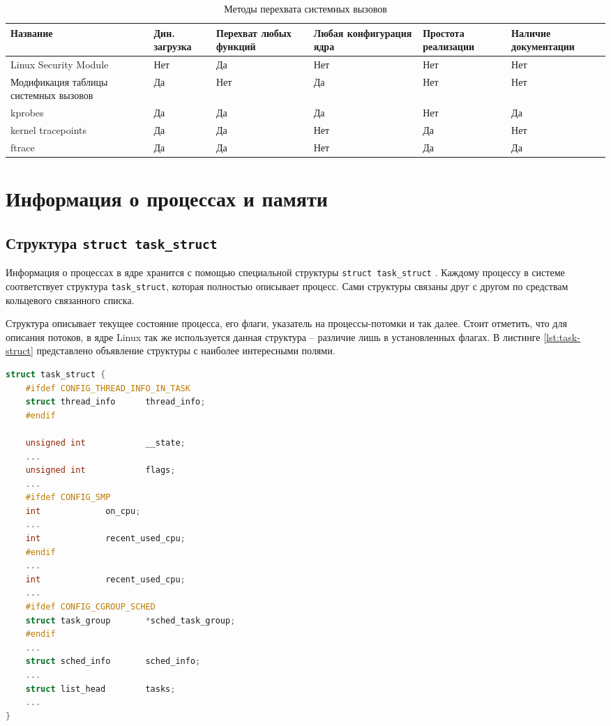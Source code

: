 \begin{table}[h]
	\centering
	\begin{tabular}{ | p{3cm} | p{2cm} | p{2cm} | p{2cm} | p{2cm} | p{2cm} | }
		\hline
		Название & Дин. загрузка & Перехват любых функций & Любая конфигурация ядра & Простота реализации & Наличие документации \\
		\hline
		Linux Security Module & Нет & Да & Нет & Нет & Нет \\
		\hline
		Модификация таблицы системных вызовов & Да & Нет & Да & Нет & Нет \\
		\hline
		kprobes & Да & Да & Да & Нет & Да \\
		\hline
		kernel tracepoints & Да & Да & Нет & Да & Нет \\
		\hline
		ftrace & Да & Да & Нет & Да & Да \\
		\hline
	\end{tabular}
	\caption{\label{tab:analyze} Методы перехвата системных вызовов}
\end{table}

\section{Информация о процессах и памяти}

\subsection{Структура \texttt{struct task\_struct}}

Информация о процессах в ядре хранится с помощью специальной структуры \texttt{struct task\_struct} \cite{task-struct}. Каждому процессу в системе соответствует структура \texttt{task\_struct}, которая полностью описывает процесс. Сами структуры связаны друг с другом по средствам кольцевого связанного списка. 

Структура описывает текущее состояние процесса, его флаги, указатель на процессы-потомки и так далее. Стоит отметить, что для описания потоков, в ядре Linux так же используется данная структура -- различие лишь в установленных флагах. В листинге \ref{lst:task-struct} представлено объявление структуры с наиболее интересными полями.\\

\begin{lstlisting}[label=lst:task-struct, caption=Листинг структуры task\_struct с наиболее интересными полями, language=c]
struct task_struct {
	#ifdef CONFIG_THREAD_INFO_IN_TASK
	struct thread_info		thread_info;
	#endif

	unsigned int			__state;
	...
	unsigned int			flags;
	...
	#ifdef CONFIG_SMP
	int				on_cpu;
	...
	int				recent_used_cpu;
	#endif
	...
	int				recent_used_cpu;
	...
	#ifdef CONFIG_CGROUP_SCHED
	struct task_group		*sched_task_group;
	#endif
	...
	struct sched_info		sched_info;
	...
	struct list_head		tasks;
	...
}
\end{lstlisting}

